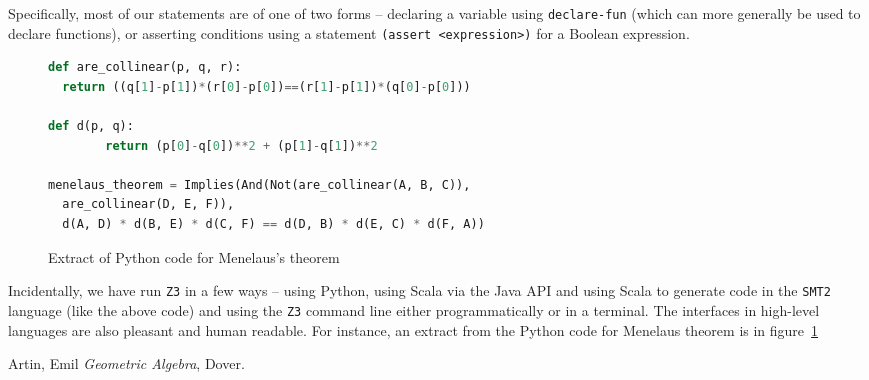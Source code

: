 \documentclass{amsart}
\theoremstyle{plain}
\theoremstyle{definition}
\theoremstyle{remark}
\begin{document}
Specifically, most of our statements are of one of two forms --
declaring a variable using \texttt{declare-fun} (which can more
generally be used to declare functions), or asserting conditions using a
statement \texttt{(assert\ <expression>)} for a
Boolean expression.

	{\small
		\begin{figure}
			\begin{lstlisting}[language=Python, frame=single]
def are_collinear(p, q, r):
  return ((q[1]-p[1])*(r[0]-p[0])==(r[1]-p[1])*(q[0]-p[0]))

def d(p, q):
        return (p[0]-q[0])**2 + (p[1]-q[1])**2

menelaus_theorem = Implies(And(Not(are_collinear(A, B, C)), 
  are_collinear(D, E, F)), 
  d(A, D) * d(B, E) * d(C, F) == d(D, B) * d(E, C) * d(F, A))
\end{lstlisting}
			\caption{Extract of Python code for Menelaus's theorem}\label{python-menelaus}
		\end{figure}
	}

Incidentally, we have run \texttt{Z3} in a few ways -- using Python, using Scala
via the Java API and using Scala to generate code in the \texttt{SMT2} language
(like the above code) and using the \texttt{Z3} command line either
programmatically or in a terminal. The interfaces in high-level
languages are also pleasant and human readable. For instance, an extract
from the Python code for Menelaus theorem is in figure~\ref{python-menelaus}



\begin{thebibliography}{10}

	 Artin, Emil
	\textit{Geometric Algebra},
	Dover.

\end{thebibliography} 
\end{document}
